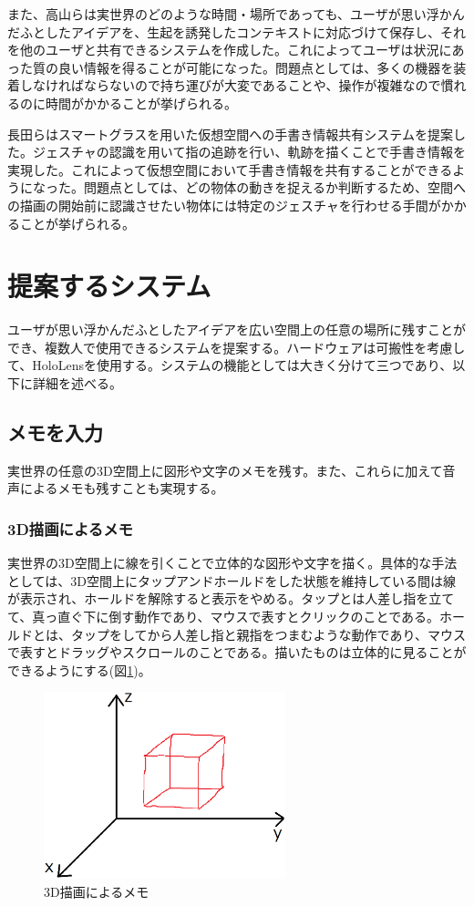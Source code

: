 \documentclass{hissymp}
\begin{document}
また、高山ら\cite{tex3,tex4}は実世界のどのような時間・場所であっても、ユーザが思い浮かんだふとしたアイデアを、生起を誘発したコンテキストに対応づけて保存し、それを他のユーザと共有できるシステムを作成した。これによってユーザは状況にあった質の良い情報を得ることが可能になった。問題点としては、多くの機器を装着しなければならないので持ち運びが大変であることや、操作が複雑なので慣れるのに時間がかかることが挙げられる。

長田ら\cite{tex5}はスマートグラスを用いた仮想空間への手書き情報共有システムを提案した。ジェスチャの認識を用いて指の追跡を行い、軌跡を描くことで手書き情報を実現した。これによって仮想空間において手書き情報を共有することができるようになった。問題点としては、どの物体の動きを捉えるか判断するため、空間への描画の開始前に認識させたい物体には特定のジェスチャを行わせる手間がかかることが挙げられる。


\section{提案するシステム}
ユーザが思い浮かんだふとしたアイデアを広い空間上の任意の場所に残すことができ、複数人で使用できるシステムを提案する。ハードウェアは可搬性を考慮して、HoloLensを使用する。システムの機能としては大きく分けて三つであり、以下に詳細を述べる。

\subsection{メモを入力}
実世界の任意の3D空間上に図形や文字のメモを残す。また、これらに加えて音声によるメモも残すことも実現する。
\subsubsection{3D描画によるメモ}
実世界の3D空間上に線を引くことで立体的な図形や文字を描く。具体的な手法としては、3D空間上にタップアンドホールドをした状態を維持している間は線が表示され、ホールドを解除すると表示をやめる。タップとは人差し指を立てて、真っ直ぐ下に倒す動作であり、マウスで表すとクリックのことである。ホールドとは、タップをしてから人差し指と親指をつまむような動作であり、マウスで表すとドラッグやスクロールのことである。描いたものは立体的に見ることができるようにする(図\ref{fig:3d_draw})。

\begin{figure}[h]
  \begin{center}
    \includegraphics[clip,width=7.0cm]{./3d_draw.eps}
    \caption{3D描画によるメモ}
    \label{fig:3d_draw}
  \end{center}
\end{figure}
\end{document}
